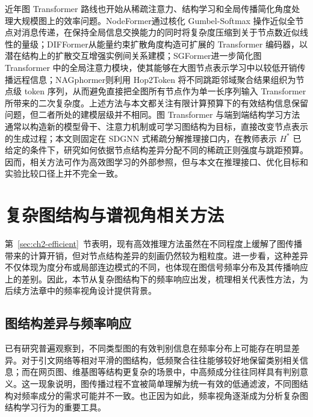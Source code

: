 近年图 Transformer 路线也开始从稀疏注意力、结构学习和全局传播简化角度处理大规模图上的效率问题。\label{idx:theme:sparsegraphtransformer}NodeFormer\cite{Wu2022NodeFormer}\label{idx:name:nodeformer}通过核化 Gumbel-Softmax 操作近似全节点对消息传递，在保持全局信息交换能力的同时将复杂度压缩到关于节点数近似线性的量级；DIFFormer\cite{Wu2023DIFFormer}\label{idx:name:difformer}从能量约束扩散角度构造可扩展的 Transformer 编码器，以潜在结构上的扩散交互增强实例间关系建模；SGFormer\cite{Wu2023SGFormer}\label{idx:name:sgformer}进一步简化图 Transformer 中的全局注意力模块，使其能够在大图节点表示学习中以较低开销传播远程信息；NAGphormer\cite{Chen2023NAGphormer}\label{idx:name:nagphormer}则利用 Hop2Token 将不同跳距邻域聚合结果组织为节点级 token 序列，从而避免直接把全图所有节点作为单一长序列输入 Transformer 所带来的二次复杂度。上述方法与本文都关注有限计算预算下的有效结构信息保留问题，但二者所处的建模层级并不相同。图 Transformer 与端到端结构学习方法通常以构造新的模型骨干、注意力机制或可学习图结构为目标，直接改变节点表示的生成过程；本文则固定在 SDGNN 式稀疏分解推理接口内，在教师表示 $H^*$ 已给定的条件下，研究如何依据节点结构差异分配不同的稀疏正则强度与跳距预算。因而，相关方法可作为高效图学习的外部参照，但与本文在推理接口、优化目标和实验比较口径上并不完全一致。

\section{复杂图结构与谱视角相关方法}
\label{sec:ch2-heterophily}

第~\ref{sec:ch2-efficient}~节表明，现有高效推理方法虽然在不同程度上缓解了图传播带来的计算开销，但对节点结构差异的刻画仍然较为粗粒度。进一步看，这种差异不仅体现为度分布或局部连边模式的不同，也体现在图信号频率分布及其传播响应上的差别。因此，本节从复杂图结构下的频率响应出发，梳理相关代表性方法，为后续方法章中的频率视角设计提供背景。

\subsection{图结构差异与频率响应}
\label{subsec:ch2-homophily}

已有研究普遍观察到，不同类型图的有效判别信息在频率分布上可能存在明显差异。对于引文网络等相对平滑的图结构，低频聚合往往能够较好地保留类别相关信息；而在网页图、维基图等结构更复杂的场景中，中高频成分往往同样具有判别意义\cite{Pei2020GeomGCN,Zhu2020H2GCN}。这一现象说明，图传播过程不宜被简单理解为统一有效的低通滤波，不同图结构对频率成分的需求可能并不一致。也正因为如此，频率视角逐渐成为分析复杂图结构学习行为的重要工具。

